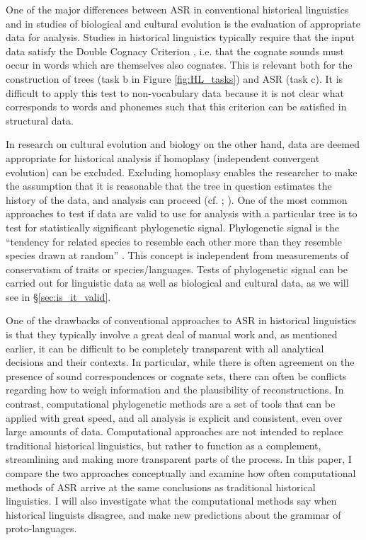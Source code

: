 \documentclass[12pt,letterpaper]{article}
\begin{document}
One of the major differences between ASR in conventional historical linguistics and in studies of biological and cultural evolution is the evaluation of appropriate data for analysis. Studies in historical linguistics typically require that the input data satisfy the Double Cognacy Criterion \citep{walkden_2013}, i.e. that the cognate sounds must occur in words which are themselves also cognates. This is relevant both for the construction of trees (task b in Figure \ref{fig:HL_tasks}) and ASR (task c). It is difficult to apply this test to non-vocabulary data because it is not clear what corresponds to words and phonemes such that this criterion can be satisfied in structural data. 

In research on cultural evolution and biology on the other hand, data are deemed appropriate for historical analysis if homoplasy (independent convergent evolution) can be excluded. Excluding homoplasy enables the researcher to make the assumption that it is reasonable that the tree in question estimates the history of the data, and analysis can proceed (cf. \citealt{holland2020accuracy}; \citealt{evans2021uses}). One of the most common approaches to test if data are valid to use for analysis with a particular tree is to test for statistically significant phylogenetic signal. Phylogenetic signal is the ``tendency for related species to resemble each other more than they resemble species drawn at random'' \citep[905]{blomberg2002tempo}. This concept is independent from measurements of conservatism of traits or species/languages. Tests of phylogenetic signal can be carried out for linguistic data as well as biological and cultural data, as we will see in §\ref{sec:is_it_valid}.

One of the drawbacks of conventional approaches to ASR in historical linguistics is that they typically involve a great deal of manual work and, as mentioned earlier, it can be difficult to be completely transparent with all analytical decisions and their contexts. In particular, while there is often agreement on the presence of sound correspondences or cognate sets, there can often be conflicts regarding how to weigh information and the plausibility of reconstructions. In contrast, computational phylogenetic methods are a set of tools that can be applied with great speed, and all analysis is explicit and consistent, even over large amounts of data. Computational approaches are not intended to replace traditional historical linguistics, but rather to function as a complement, streamlining and making more transparent parts of the process. In this paper, I compare the two approaches conceptually and examine how often computational methods of ASR arrive at the same conclusions as traditional historical linguistics. I will also investigate what the computational methods say when historical linguists disagree, and make new predictions about the grammar of proto-languages.
\end{document}
